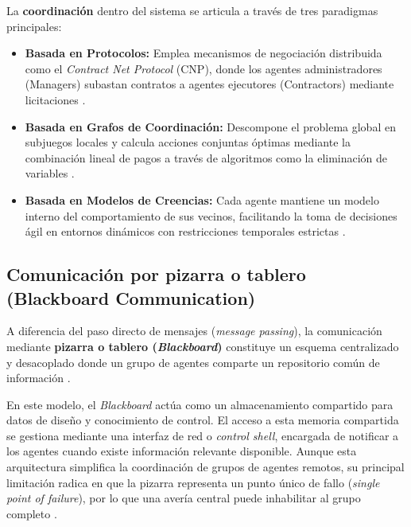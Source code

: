 \documentclass[12pt, letterpaper, oneside]{book}
\begin{document}
La \textbf{coordinación} dentro del sistema se articula a través de tres paradigmas principales:
\begin{itemize}
	\item \textbf{Basada en Protocolos:} Emplea mecanismos de negociación distribuida como el \textit{Contract Net Protocol} (CNP), donde los agentes administradores (Managers) subastan contratos a agentes ejecutores (Contractors) mediante licitaciones \cite{InnMAS2010}.
	\item \textbf{Basada en Grafos de Coordinación:} Descompone el problema global en subjuegos locales y calcula acciones conjuntas óptimas mediante la combinación lineal de pagos a través de algoritmos como la eliminación de variables \cite{InnMAS2010}.
	\item \textbf{Basada en Modelos de Creencias:} Cada agente mantiene un modelo interno del comportamiento de sus vecinos, facilitando la toma de decisiones ágil en entornos dinámicos con restricciones temporales estrictas \cite{InnMAS2010}.
\end{itemize}

\subsection{Comunicación por pizarra o tablero (Blackboard Communication)}
A diferencia del paso directo de mensajes (\textit{message passing}), la comunicación mediante \textbf{pizarra o tablero (\textit{Blackboard})} constituye un esquema centralizado y desacoplado donde un grupo de agentes comparte un repositorio común de información \cite{InnMAS2010}.

En este modelo, el \textit{Blackboard} actúa como un almacenamiento compartido para datos de diseño y conocimiento de control. El acceso a esta memoria compartida se gestiona mediante una interfaz de red o \textit{control shell}, encargada de notificar a los agentes cuando existe información relevante disponible. Aunque esta arquitectura simplifica la coordinación de grupos de agentes remotos, su principal limitación radica en que la pizarra representa un punto único de fallo (\textit{single point of failure}), por lo que una avería central puede inhabilitar al grupo completo \cite{InnMAS2010}.
\end{document}
